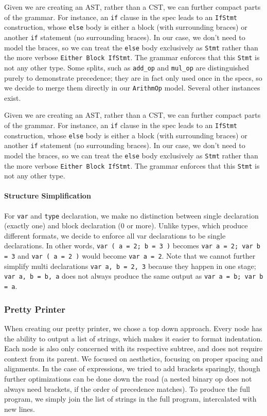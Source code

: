 \documentclass[11pt]{article}
\begin{document}
Given we are creating an AST, rather than a CST, we can further
compact parts of the grammar. For instance, an \texttt{if} clause in
the spec leads to an \texttt{IfStmt} construction, whose \texttt{else}
body is either a block (with surrounding braces) or another
\texttt{if} statement (no surrounding braces). In our case, we don't
need to model the braces, so we can treat the \texttt{else} body
exclusively as \texttt{Stmt} rather than the more verbose
\texttt{Either Block IfStmt}. The grammar enforces that this
\texttt{Stmt} is not any other type.  Some splits, such as
\texttt{add\_op} and \texttt{mul\_op} are distinguished purely to
demonstrate precedence; they are in fact only used once in the specs,
so we decide to merge them directly in our \texttt{ArithmOp}
model. Several other instances exist.

Given we are creating an AST, rather than a CST, we can further
compact parts of the grammar. For instance, an \texttt{if} clause in
the spec leads to an \texttt{IfStmt} construction, whose \texttt{else}
body is either a block (with surrounding braces) or another
\texttt{if} statement (no surrounding braces). In our case, we don't
need to model the braces, so we can treat the \texttt{else} body
exclusively as \texttt{Stmt} rather than the more verbose
\texttt{Either Block IfStmt}. The grammar enforces that this
\texttt{Stmt} is not any other type.
\paragraph{Structure Simplification}
For \texttt{var} and \texttt{type} declaration, we make no distinction
between single declaration (exactly one) and block declaration (0 or
more). Unlike types, which produce different formats, we decide to
enforce all var declarations to be single declarations. In other
words, \texttt{var ( a = 2; b = 3 )} becomes \texttt{var a = 2; var b = 3}
and \texttt{var ( a = 2 )} would become \texttt{var a = 2}. Note
that we cannot further simplify multi declarations \texttt{var a, b
  = 2, 3} because they happen in one stage; 
  \texttt{var a, b = b, a} does not always produce the same output as 
  \texttt{var a = b; var b = a}.

\subsubsection{Pretty Printer}
When creating our pretty printer, we chose a top down approach.  Every
node has the ability to output a list of strings, which makes it
easier to format indentation. Each node is also only concerned with
its respective subtree, and does not require context from its
parent. We focused on aesthetics, focusing on proper spacing and
alignments. In the case of expressions, we tried to add brackets
sparingly, though further optimizations can be done down the road (a
nested binary op does not always need brackets, if the order of
precedence matches). To produce the full program, we simply join the
list of strings in the full program, intercalated with new lines.
\end{document}
